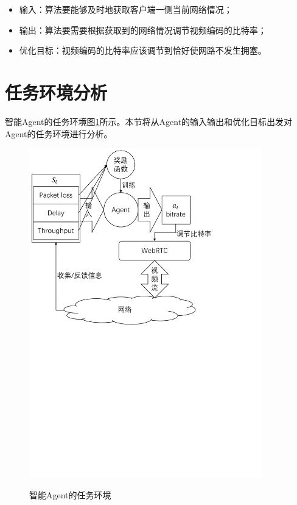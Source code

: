 \documentclass[a4paper]{ctexart}
\begin{document}
\begin{itemize}
	\item 输入：算法要能够及时地获取客户端一侧当前网络情况；
	\item 输出：算法要需要根据获取到的网络情况调节视频编码的比特率；
	\item 优化目标：视频编码的比特率应该调节到恰好使网路不发生拥塞。
\end{itemize}

\section{任务环境分析}\label{sec:任务环境分析}

智能Agent的任务环境图\ref{figure:env}所示。本节将从Agent的输入输出和优化目标出发对Agent的任务环境进行分析。

\begin{figure}[htbp]
	\centering
	\includegraphics[width=0.9\textwidth, keepaspectratio]{figure/env.pdf}\\
	\caption{智能Agent的任务环境}\label{figure:env}
\end{figure}
\end{document}
